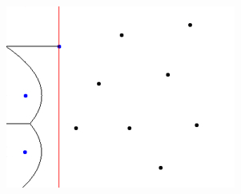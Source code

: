 \begin{figure}[H]
\begin{center}
\begin{minipage}[h]{0.3\linewidth}
            \includegraphics[width=1\linewidth]{fortunes-algo-02.jpg}
        \end{minipage}
    \end{center}
\end{figure}

